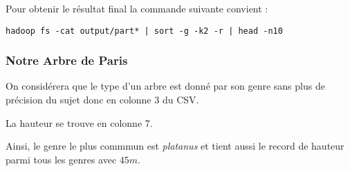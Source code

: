 \documentclass[french]{article}
\begin{document}
Pour obtenir le résultat final la commande suivante convient : 

\begin{verbatim}
hadoop fs -cat output/part* | sort -g -k2 -r | head -n10
\end{verbatim}

\subsubsection{Notre Arbre de Paris}
On considérera que le type d'un arbre est donné par son genre sans plus de précision du sujet donc en colonne 3 du CSV.

La hauteur se trouve en colonne 7.

Ainsi, le genre le plus commmun est \textsl{platanus} et tient aussi le record de hauteur parmi tous les genres avec $45m$.
\end{document}
